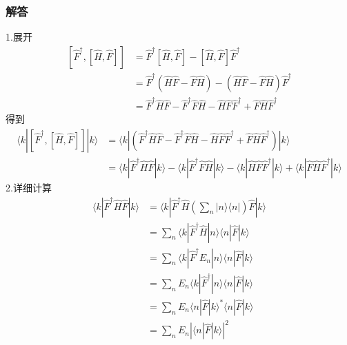 \subsubsection{解答}
1.展开
\begin{equation}
    \begin{aligned}
        \left[ \hat{F}^{\dagger},\left[ \hat{H},\hat{F} \right] \right] &=\hat{F}^{\dagger}\left[ \hat{H},\hat{F} \right] -\left[ \hat{H},\hat{F} \right] \hat{F}^{\dagger}
\\
&=\hat{F}^{\dagger}\left( \hat{H}\hat{F}-\hat{F}\hat{H} \right) -\left( \hat{H}\hat{F}-\hat{F}\hat{H} \right) \hat{F}^{\dagger}
\\
&=\hat{F}^{\dagger}\hat{H}\hat{F}-\hat{F}^{\dagger}\hat{F}\hat{H}-\hat{H}\hat{F}\hat{F}^{\dagger}+\hat{F}\hat{H}\hat{F}^{\dagger}
    \end{aligned}
\end{equation}
得到
\begin{equation}
    \begin{aligned}
        \langle k|\left[ \hat{F}^{\dagger},\left[ \hat{H},\hat{F} \right] \right] |k\rangle &=\langle k|\left( \hat{F}^{\dagger}\hat{H}\hat{F}-\hat{F}^{\dagger}\hat{F}\hat{H}-\hat{H}\hat{F}\hat{F}^{\dagger}+\hat{F}\hat{H}\hat{F}^{\dagger} \right) |k\rangle 
\\
&=\langle k|\hat{F}^{\dagger}\hat{H}\hat{F}|k\rangle -\langle k|\hat{F}^{\dagger}\hat{F}\hat{H}|k\rangle -\langle k|\hat{H}\hat{F}\hat{F}^{\dagger}|k\rangle +\langle k|\hat{F}\hat{H}\hat{F}^{\dagger}|k\rangle 
    \end{aligned}
\end{equation}
2.详细计算
\begin{equation}
    \begin{aligned}
        \langle k|\hat{F}^{\dagger}\hat{H}\hat{F}|k\rangle &=\langle k|\hat{F}^{\dagger}\hat{H}\left( \sum_n{|n\rangle \langle n|} \right) \hat{F}|k\rangle 
\\
&=\sum_n{\langle k|\hat{F}^{\dagger}\hat{H}|n\rangle \langle n|\hat{F}|k\rangle}
\\
&=\sum_n{\langle k|\hat{F}^{\dagger}E_n|n\rangle \langle n|\hat{F}|k\rangle}
\\
&=\sum_n{E_n\langle k|\hat{F}^{\dagger}|n\rangle \langle n|\hat{F}|k\rangle}
\\
&=\sum_n{E_n\langle n|\hat{F}|k\rangle ^*\langle n|\hat{F}|k\rangle}
\\
&=\sum_n{E_n\left| \langle n|\hat{F}|k\rangle \right|^2}
    \end{aligned}
\end{equation}
